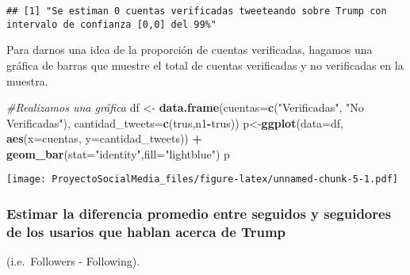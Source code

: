 \documentclass[
]{article}
\newenvironment{Shaded}{\begin{snugshade}}{\end{snugshade}}
\newcommand{\CommentTok}[1]{\textcolor[rgb]{0.56,0.35,0.01}{\textit{#1}}}
\newcommand{\DataTypeTok}[1]{\textcolor[rgb]{0.13,0.29,0.53}{#1}}
\newcommand{\KeywordTok}[1]{\textcolor[rgb]{0.13,0.29,0.53}{\textbf{#1}}}
\newcommand{\NormalTok}[1]{#1}
\newcommand{\OperatorTok}[1]{\textcolor[rgb]{0.81,0.36,0.00}{\textbf{#1}}}
\newcommand{\StringTok}[1]{\textcolor[rgb]{0.31,0.60,0.02}{#1}}
\begin{document}
\begin{verbatim}
## [1] "Se estiman 0 cuentas verificadas tweeteando sobre Trump con intervalo de confianza [0,0] del 99%"
\end{verbatim}

Para darnos una idea de la proporción de cuentas verificadas, hagamos
una gráfica de barras que muestre el total de cuentas verificadas y no
verificadas en la muestra.

\begin{Shaded}
\begin{Highlighting}[]
\CommentTok{#Realizamos una gráfica }
\NormalTok{df <-}\StringTok{ }\KeywordTok{data.frame}\NormalTok{(}\DataTypeTok{cuentas=}\KeywordTok{c}\NormalTok{(}\StringTok{"Verificadas"}\NormalTok{, }\StringTok{"No Verificadas"}\NormalTok{),}
                 \DataTypeTok{cantidad_tweets=}\KeywordTok{c}\NormalTok{(trus,n1}\OperatorTok{-}\NormalTok{trus))}
\NormalTok{p<-}\KeywordTok{ggplot}\NormalTok{(}\DataTypeTok{data=}\NormalTok{df, }\KeywordTok{aes}\NormalTok{(}\DataTypeTok{x=}\NormalTok{cuentas, }\DataTypeTok{y=}\NormalTok{cantidad_tweets)) }\OperatorTok{+}
\StringTok{  }\KeywordTok{geom_bar}\NormalTok{(}\DataTypeTok{stat=}\StringTok{"identity"}\NormalTok{,}\DataTypeTok{fill=}\StringTok{"lightblue"}\NormalTok{)}
\NormalTok{p}
\end{Highlighting}
\end{Shaded}

\texttt{[image: ProyectoSocialMedia\_files/figure-latex/unnamed-chunk-5-1.pdf]}

\hypertarget{estimar-la-diferencia-promedio-entre-seguidos-y-seguidores-de-los-usarios-que-hablan-acerca-de-trump}{%
\subsubsection{Estimar la diferencia promedio entre seguidos y
seguidores de los usarios que hablan acerca de
Trump}\label{estimar-la-diferencia-promedio-entre-seguidos-y-seguidores-de-los-usarios-que-hablan-acerca-de-trump}}

(i.e.~Followers - Following).
\end{document}
